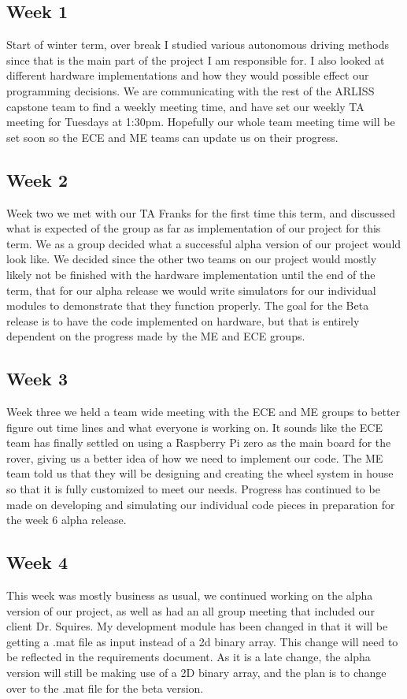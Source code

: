 \documentclass[10pt,letterpaper,onecolumn,draftclsnofoot,journal]{IEEEtran}
\begin{document}
\subsection{Week 1}
Start of winter term, over break I studied various autonomous driving methods since that is the main part of the project I am responsible for. I also looked at different hardware implementations and how they would possible effect our programming decisions. We are communicating with the rest of the ARLISS capstone team to find a weekly meeting time, and have set our weekly TA meeting for Tuesdays at 1:30pm. Hopefully our whole team meeting time will be set soon so the ECE and ME teams can update us on their progress.

\subsection{Week 2}
Week two we met with our TA Franks for the first time this term, and discussed what is expected of the group as far as implementation of our project for this term. We as a group decided what a successful alpha version of our project would look like. We decided since the other two teams on our project would mostly likely not be finished with the hardware implementation until the end of the term, that for our alpha release we would write simulators for our individual modules to demonstrate that they function properly. The goal for the Beta release is to have the code implemented on hardware, but that is entirely dependent on the progress made by the ME and ECE groups.


\subsection{Week 3}
Week three we held a team wide meeting with the ECE and ME groups to better figure out time lines and what everyone is working on. It sounds like the ECE team has finally settled on using a Raspberry Pi zero as the main board for the rover, giving us a better idea of how we need to implement our code. The ME team told us that they will be designing and creating the wheel system in house so that it is fully customized to meet our needs. Progress has continued to be made on developing and simulating our individual code pieces in preparation for the week 6 alpha release.

\subsection{Week 4}
This week was mostly business as usual, we continued working on the alpha version of our project, as well as had an all group meeting that included our client Dr. Squires. My development module has been changed in that it will be getting a .mat file as input instead of a 2d binary array. This change will need to be reflected in the requirements document. As it is a late change, the alpha version will still be making use of a 2D binary array, and the plan is to change over to the .mat file for the beta version.
\end{document}
